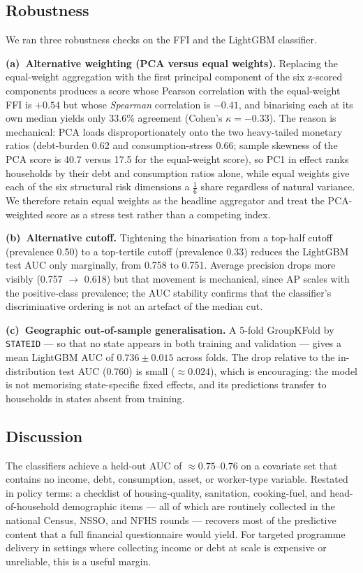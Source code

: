 \documentclass[colorlinks,balance]{asmeconf}
\begin{document}
\subsection{Robustness}\label{sec:robustness}
We ran three robustness checks on the FFI and the LightGBM classifier.

\textbf{(a)~Alternative weighting (PCA versus equal weights).} Replacing the equal-weight aggregation with the first principal component of the six z-scored components produces a score whose Pearson correlation with the equal-weight FFI is $+0.54$ but whose \emph{Spearman} correlation is $-0.41$, and binarising each at its own median yields only 33.6\% agreement (Cohen's $\kappa = -0.33$). The reason is mechanical: PCA loads disproportionately onto the two heavy-tailed monetary ratios (debt-burden 0.62 and consumption-stress 0.66; sample skewness of the PCA score is 40.7 versus 17.5 for the equal-weight score), so PC1 in effect ranks households by their debt and consumption ratios alone, while equal weights give each of the six structural risk dimensions a $\frac{1}{6}$ share regardless of natural variance. We therefore retain equal weights as the headline aggregator and treat the PCA-weighted score as a stress test rather than a competing index.

\textbf{(b)~Alternative cutoff.} Tightening the binarisation from a top-half cutoff (prevalence 0.50) to a top-tertile cutoff (prevalence 0.33) reduces the LightGBM test AUC only marginally, from 0.758 to 0.751. Average precision drops more visibly (0.757 $\to$ 0.618) but that movement is mechanical, since AP scales with the positive-class prevalence; the AUC stability confirms that the classifier's discriminative ordering is not an artefact of the median cut.

\textbf{(c)~Geographic out-of-sample generalisation.} A 5-fold GroupKFold by \texttt{STATEID} --- so that no state appears in both training and validation --- gives a mean LightGBM AUC of $0.736 \pm 0.015$ across folds. The drop relative to the in-distribution test AUC (0.760) is small ($\approx 0.024$), which is encouraging: the model is not memorising state-specific fixed effects, and its predictions transfer to households in states absent from training.

\subsection{Discussion}
The classifiers achieve a held-out AUC of $\approx 0.75$--$0.76$ on a covariate set that contains no income, debt, consumption, asset, or worker-type variable. Restated in policy terms: a checklist of housing-quality, sanitation, cooking-fuel, and head-of-household demographic items --- all of which are routinely collected in the national Census, NSSO, and NFHS rounds --- recovers most of the predictive content that a full financial questionnaire would yield. For targeted programme delivery in settings where collecting income or debt at scale is expensive or unreliable, this is a useful margin.
\end{document}
